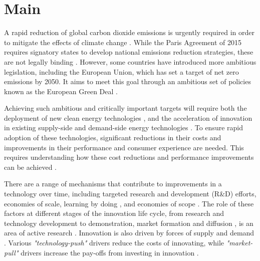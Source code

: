 \documentclass[parskip=full]{article}
\begin{document}
\section{Main}
\label{sec:intro}

A rapid reduction of global carbon dioxide emissions is urgently required in order to mitigate the effects of climate change \cite{Forster2019}. While the Paris Agreement of 2015 requires signatory states to develop national emissions reduction strategies, these are not legally binding \cite{bodansky2016legal}. However, some countries have introduced more ambitious legislation, including the European Union, which has set a target of net zero emissions by 2050. It aims to meet this goal through an ambitious set of policies known as the European Green Deal \cite{eu2020green}.

Achieving such ambitious and critically important targets will require both the deployment of new clean energy technologies \cite{iea2020cleanenergy}, and the acceleration of innovation in existing supply-side \cite{sinn2012green} and demand-side energy technologies \cite{rgeVorsatz2009}. To ensure rapid adoption of these technologies, significant reductions in their costs and improvements in their performance and consumer experience are needed. This requires understanding how these cost reductions and performance improvements can be achieved \cite{Stephan2021,Ziegler2021}.

There are a range of mechanisms that contribute to improvements in a technology over time, including targeted research and development (R\&D) efforts, economies of scale, learning by doing \cite{WRIGHT_1936, Arrow_1962}, and economies of scope \cite{johansson2012global, national2016power, iea2020perspectives}. The role of these factors at different stages of the innovation life cycle, from research and technology development to demonstration, market formation and diffusion \cite{grubler2012policies}, is an area of active research  \cite{kavlak2018evaluating, Ziegler2021}. Innovation is also driven by forces of supply and demand \cite{Mowery1979}. Various \textit{"technology-push"} drivers reduce the costs of innovating, while \textit{"market-pull"} drivers increase the pay-offs from investing in innovation \cite{anadon2009policy}.
\end{document}
